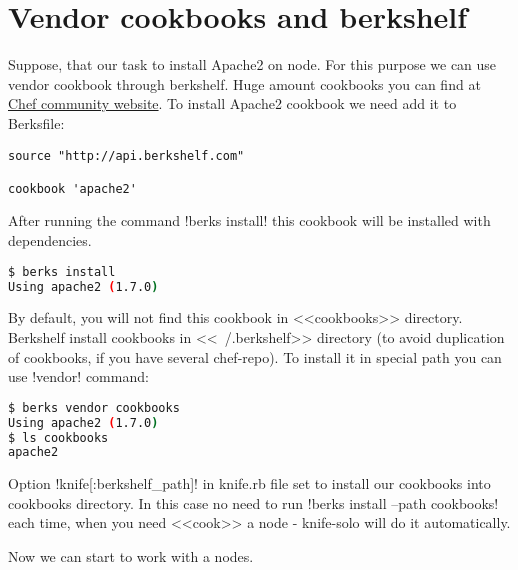\section{Vendor cookbooks and berkshelf}
\label{sec:solo-berkshelf}

Suppose, that our task to install Apache2 on node. For this purpose we can use vendor cookbook through berkshelf. Huge amount cookbooks you can find at \href{https://supermarket.getchef.com/cookbooks-directory}{Chef community website}. To install Apache2 cookbook we need add it to Berksfile:

\begin{lstlisting}[label=lst:my-cloud-berkshelf1,title=my-cloud/Berksfile]
source "http://api.berkshelf.com"

cookbook 'apache2'
\end{lstlisting}

After running the command \inline!berks install! this cookbook will be installed with dependencies.

\begin{lstlisting}[language=Bash,label=lst:my-cloud-berkshelf2]
$ berks install
Using apache2 (1.7.0)
\end{lstlisting}

By default, you will not find this cookbook in <<cookbooks>> directory. Berkshelf install cookbooks in <<~/.berkshelf>> directory (to avoid duplication of cookbooks, if you have several chef-repo). To install it in special path you can use \inline!vendor! command:

\begin{lstlisting}[language=Bash,label=lst:my-cloud-berkshelf3]
$ berks vendor cookbooks
Using apache2 (1.7.0)
$ ls cookbooks
apache2
\end{lstlisting}

Option \inline!knife[:berkshelf_path]! in knife.rb file set to install our cookbooks into cookbooks directory. In this case no need to run \inline!berks install --path cookbooks! each time, when you need <<cook>> a node - knife-solo will do it automatically.

Now we can start to work with a nodes.
